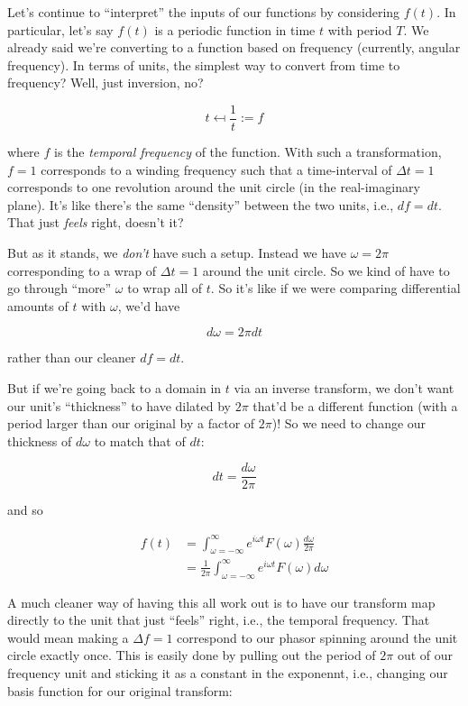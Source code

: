 \documentclass[letterpaper,12pt]{report}
\begin{document}
Let's continue to ``interpret'' the inputs of our functions
by considering \(f(t)\). In particular, let's say \(f(t)\)
is a periodic function in time \(t\) with period \(T\). 
We already said we're converting to a function based
on frequency (currently, angular frequency).
In terms of units,
the simplest way to convert from time to frequency?
Well, just inversion, no?

\[t \mapsfrom \frac{1}{t} := f \]

where \(f\) is the \emph{temporal frequency} of the function.
With such a transformation, \(f=1\) corresponds to
a winding frequency such that a time-interval
of \(\Delta t = 1\) corresponds to one revolution around
the unit circle (in the real-imaginary plane).
It's like there's the same ``density'' between the two units,
i.e., \(df = dt\).
That just \emph{feels} right, doesn't it?
\par

But as it stands, we \emph{don't} have such a setup.
Instead we have \(\omega = 2\pi\) corresponding to
a wrap of \(\Delta t = 1\) around the unit circle.
So we kind of have to go through ``more'' \(\omega\)
to wrap all of \(t\). 
So it's like if we were comparing
differential amounts of \(t\) with \(\omega\), we'd have

\[d\omega = 2\pi dt\]

rather than our cleaner \(df = dt\).\par
But if we're going back to a domain in \(t\) 
via an inverse transform, we don't
want our unit's ``thickness'' to have dilated by \(2\pi\)
\textemdash{} that'd be a different function (with a period
larger than our original by a factor of \(2\pi\))!
So we need to change our thickness of \(d\omega\) to match
that of \(dt\):

\[  dt = \frac{d\omega}{2\pi} \]

and so

\[\begin{split}
  f(t) &=
  \int_{\omega=-\infty}^{\infty} e^{i\omega t} F(\omega) \frac{d\omega}{2\pi} \\
  &= \frac{1}{2\pi}\int_{\omega=-\infty}^{\infty} e^{i\omega t} F(\omega) d\omega
\end{split}\]

A much cleaner way of having this all work out
is to have our transform map directly to the unit that just
``feels'' right, i.e., the temporal frequency.
That would mean making a \(\Delta f = 1\) correspond to
our phasor spinning around the unit circle exactly once.
This is easily done by pulling out the period of \(2\pi\)
out of our frequency unit and sticking it as a constant
in the exponennt, i.e., changing our basis function
for our original transform:
\end{document}
